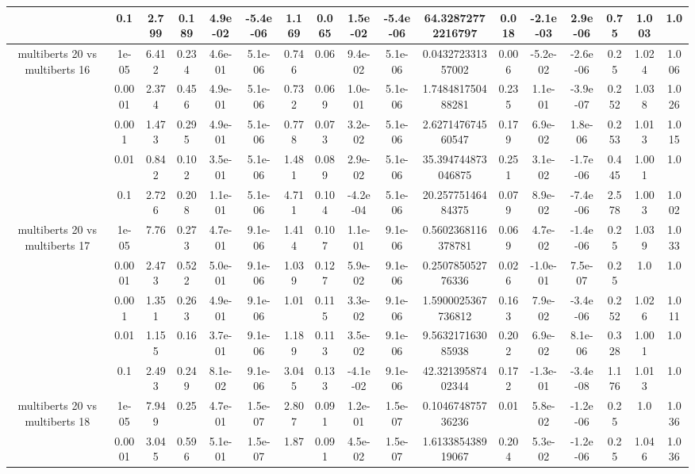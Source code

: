 \begin{tabular}{|c|c|c|c|c|c|c|c|c|c|c|c|c|c|c|c|c|}
 & 0.1 & 2.799 & 0.189 & 4.9e-02 & -5.4e-06 & 1.169 & 0.065 & 1.5e-02 & -5.4e-06 & 64.32872772216797 & 0.018 & -2.1e-03 & 2.9e-06 & 0.75 & 1.003 & 1.0 \\
\hline
\multirow{5}{*}{multiberts 20 vs multiberts 16} & 1e-05 & 6.412 & 0.234 & 4.6e-01 & 5.1e-06 & 0.746 & 0.06 & 9.4e-02 & 5.1e-06 & 0.043272331357002 & 0.006 & -5.2e-02 & -2.6e-06 & 0.25 & 1.024 & 1.006 \\
 & 0.0001 & 2.374 & 0.456 & 4.9e-01 & 5.1e-06 & 0.732 & 0.069 & 1.0e-01 & 5.1e-06 & 1.748481750488281 & 0.235 & 1.1e-01 & -3.9e-07 & 0.252 & 1.038 & 1.026 \\
 & 0.001 & 1.473 & 0.295 & 4.9e-01 & 5.1e-06 & 0.778 & 0.073 & 3.2e-02 & 5.1e-06 & 2.627147674560547 & 0.179 & 6.9e-02 & 1.8e-06 & 0.253 & 1.013 & 1.015 \\
 & 0.01 & 0.842 & 0.102 & 3.5e-01 & 5.1e-06 & 1.481 & 0.089 & 2.9e-02 & 5.1e-06 & 35.394744873046875 & 0.251 & 3.1e-02 & -1.7e-06 & 0.445 & 1.001 & 1.0 \\
 & 0.1 & 2.726 & 0.208 & 1.1e-01 & 5.1e-06 & 4.711 & 0.104 & -4.2e-04 & 5.1e-06 & 20.25775146484375 & 0.079 & 8.9e-02 & -7.4e-06 & 2.578 & 1.003 & 1.002 \\
\hline
\multirow{5}{*}{multiberts 20 vs multiberts 17} & 1e-05 & 7.76 & 0.273 & 4.7e-01 & 9.1e-06 & 1.414 & 0.107 & 1.1e-01 & 9.1e-06 & 0.5602368116378781 & 0.069 & 4.7e-02 & -1.4e-06 & 0.25 & 1.039 & 1.033 \\
 & 0.0001 & 2.473 & 0.522 & 5.0e-01 & 9.1e-06 & 1.039 & 0.127 & 5.9e-02 & 9.1e-06 & 0.250785052776336 & 0.026 & -1.0e-01 & 7.5e-07 & 0.25 & 1.0 & 1.0 \\
 & 0.001 & 1.351 & 0.263 & 4.9e-01 & 9.1e-06 & 1.01 & 0.115 & 3.3e-02 & 9.1e-06 & 1.5900025367736812 & 0.163 & 7.9e-02 & -3.4e-06 & 0.252 & 1.026 & 1.011 \\
 & 0.01 & 1.155 & 0.16 & 3.7e-01 & 9.1e-06 & 1.189 & 0.113 & 3.5e-02 & 9.1e-06 & 9.563217163085938 & 0.202 & 6.9e-02 & 8.1e-06 & 0.328 & 1.001 & 1.0 \\
 & 0.1 & 2.493 & 0.249 & 8.1e-02 & 9.1e-06 & 3.045 & 0.133 & -4.1e-02 & 9.1e-06 & 42.32139587402344 & 0.172 & -1.3e-01 & -3.4e-08 & 1.176 & 1.013 & 1.0 \\
\hline
\multirow{5}{*}{multiberts 20 vs multiberts 18} & 1e-05 & 7.949 & 0.25 & 4.7e-01 & 1.5e-07 & 2.807 & 0.091 & 1.2e-01 & 1.5e-07 & 0.104674875736236 & 0.01 & 5.8e-02 & -1.2e-06 & 0.25 & 1.0 & 1.036 \\
 & 0.0001 & 3.045 & 0.596 & 5.1e-01 & 1.5e-07 & 1.87 & 0.091 & 4.5e-02 & 1.5e-07 & 1.613385438919067 & 0.204 & 5.3e-02 & -1.2e-06 & 0.25 & 1.046 & 1.036 \\

\end{tabular}
